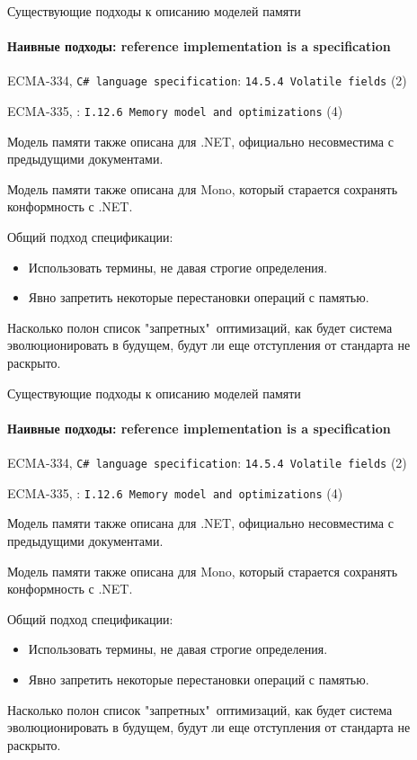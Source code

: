 \begin{frame}[t,noframenumbering]{Существующие подходы к описанию моделей памяти}
\framesubtitle{Наивные подходы: reference implementation is a specification}

{\small
ECMA-334, \texttt{C\# language specification}: \texttt{14.5.4 Volatile fields} (2)
}

{\small
ECMA-335, : \texttt{I.12.6 Memory model and optimizations} (4)
}

Модель памяти также описана для .NET, официально несовместима с предыдущими документами.

Модель памяти также описана для Mono, который старается сохранять конформность с .NET.

\pause
Общий подход спецификации:
\begin{itemize}
	\pause
	\item {}
	\pause
	Использовать термины, не давая строгие определения.

	\pause
	\item Явно запретить некоторые перестановки операций с памятью.
\end{itemize}

\pause
Насколько полон список "запретных"\ оптимизаций, как будет система эволюционировать в будущем, будут ли еще отступления от стандарта не раскрыто.

\end{frame}

\begin{frame}[t,noframenumbering]{Существующие подходы к описанию моделей памяти}
\framesubtitle{Наивные подходы: reference implementation is a specification}

{\small
ECMA-334, \texttt{C\# language specification}: \texttt{14.5.4 Volatile fields} (2)
}

{\small
ECMA-335, : \texttt{I.12.6 Memory model and optimizations} (4)
}

Модель памяти также описана для .NET, официально несовместима с предыдущими документами.

Модель памяти также описана для Mono, который старается сохранять конформность с .NET.

Общий подход спецификации:
\begin{itemize}
	\item Использовать термины, не давая строгие определения.
	\item Явно запретить некоторые перестановки операций с памятью.
\end{itemize}

Насколько полон список "запретных"\ оптимизаций, как будет система эволюционировать в будущем, будут ли еще отступления от стандарта не раскрыто.

\end{frame}



